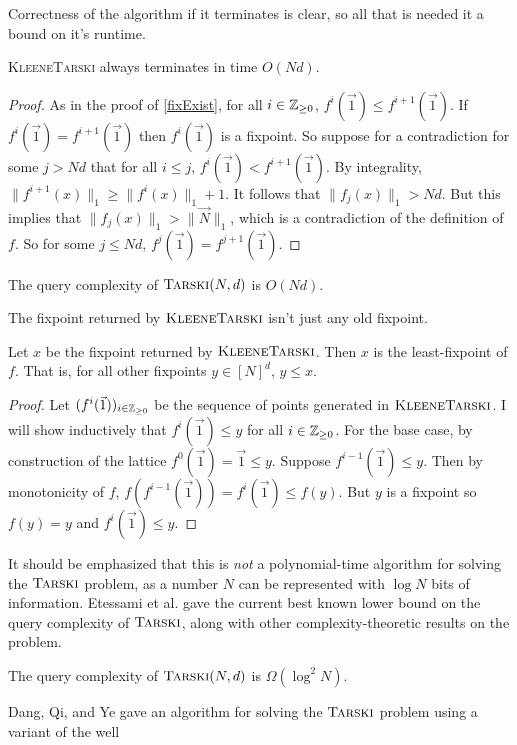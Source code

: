 Correctness of the algorithm if it terminates is clear, so all that is needed it a bound on it's runtime.
\begin{lemma}
  \textsc{KleeneTarski} always terminates in time $O(Nd)$.
\end{lemma}
\begin{proof}
  As in the proof of \cref{fixExist}, for all $i \in \mathbb{Z}_{\geq 0}$, $f^i(\vec{1}) \leq f^{i+1}(\vec{1})$. If $f^i(\vec{1}) = f^{i+1}(\vec{1})$
  then $f^i(\vec{1})$ is a fixpoint. So suppose for a contradiction for some $j > Nd$ that for all $i \leq j$, $f^i(\vec{1}) < f^{i+1}(\vec{1})$. 
  By integrality, $\|f^{i+1}(x)\|_1 \geq \|f^i(x)\|_1 + 1$. It follows that $\|f_j(x)\|_1 > Nd$. But this implies that
  $\|f_j(x)\|_1 > \|\vec{N}\|_1$, which is a contradiction of the definition of $f$. So for some $j \leq Nd$, $f^j(\vec{1}) = f^{j+1}(\vec{1})$.
\end{proof}
\begin{theorem}
  The query complexity of $\textsc{Tarski}(N,d)$ is $O(Nd)$.
\end{theorem}
The fixpoint returned by $\textsc{KleeneTarski}$ isn't just any old fixpoint.
\begin{lemma}\label{kleeneLfp}
  Let $x$ be the fixpoint returned by $\textsc{KleeneTarski}$. Then $x$ is the least-fixpoint
  of $f$. That is, for all other fixpoints $y \in [N]^d$, $y \leq x$.
\end{lemma}
\begin{proof}
  Let $(f^i(\vec{1}))_{i \in \mathbb{Z}_{\geq 0}}$ be the sequence of points generated in $\textsc{KleeneTarski}$.
  I will show inductively that $f^i(\vec{1}) \leq y$ for all $i \in \mathbb{Z}_{\geq 0}$. For the base case,
  by construction of the lattice $f^0(\vec{1}) = \vec{1} \leq y$. Suppose $f^{i-1}(\vec{1}) \leq y$.
  Then by monotonicity of $f$, $f(f^{i-1}(\vec{1})) = f^i(\vec{1}) \leq f(y)$. But $y$ is a fixpoint
  so $f(y) = y$ and $f^i(\vec{1}) \leq y$.
\end{proof}
It should be emphasized that this is \emph{not} a polynomial-time algorithm for solving the $\textsc{Tarski}$ problem, as a number
$N$ can be represented with $\log N$ bits of information. 
Etessami et al. gave the current best known lower bound on the query complexity of $\textsc{Tarski}$, along with other complexity-theoretic results
on the problem.
\begin{theorem}
  The query complexity of $\textsc{Tarski}(N, d)$ is $\Omega(\log^2N)$.
\end{theorem}
Dang, Qi, and Ye gave an algorithm for solving the $\textsc{Tarski}$ problem\citep{dangQiYe} using a variant of the well
